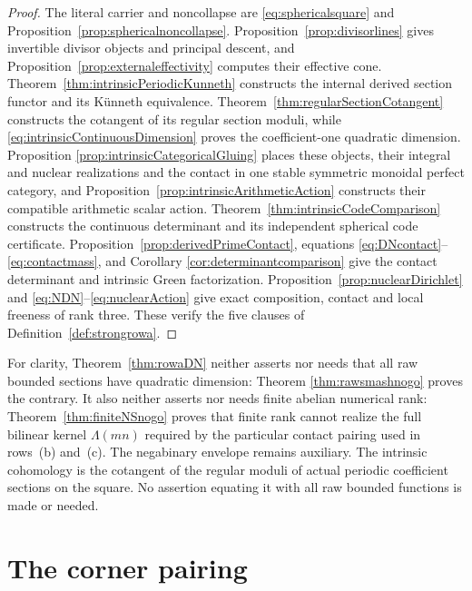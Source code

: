 \documentclass[11pt]{amsart}
\theoremstyle{definition}
\theoremstyle{remark}
\begin{document}
\begin{proof}
The literal carrier and noncollapse are
\eqref{eq:sphericalsquare} and Proposition~\ref{prop:sphericalnoncollapse}.
Proposition~\ref{prop:divisorlines} gives invertible divisor objects and
principal descent, and Proposition~\ref{prop:externaleffectivity} computes
their effective cone.  Theorem~\ref{thm:intrinsicPeriodicKunneth} constructs
the internal derived section functor and its K\"unneth equivalence.
Theorem~\ref{thm:regularSectionCotangent} constructs the cotangent of its
regular section moduli, while \eqref{eq:intrinsicContinuousDimension}
proves the coefficient-one quadratic dimension.  Proposition
\ref{prop:intrinsicCategoricalGluing} places these objects, their integral
and nuclear realizations and the contact in one stable symmetric monoidal
perfect category, and Proposition~\ref{prop:intrinsicArithmeticAction}
constructs their compatible arithmetic scalar action.
Theorem~\ref{thm:intrinsicCodeComparison} constructs the
continuous determinant and its independent spherical code certificate.
Proposition~\ref{prop:derivedPrimeContact}, equations
\eqref{eq:DNcontact}--\eqref{eq:contactmass}, and Corollary
\ref{cor:determinantcomparison} give the contact determinant and intrinsic
Green factorization.
Proposition~\ref{prop:nuclearDirichlet}
and \eqref{eq:NDN}--\eqref{eq:nuclearAction} give exact composition,
contact and local freeness of rank three.  These verify the five clauses of
Definition~\ref{def:strongrowa}.
\end{proof}

For clarity, Theorem~\ref{thm:rowaDN} neither asserts nor needs that
all raw bounded sections have quadratic dimension: Theorem
\ref{thm:rawsmashnogo} proves the contrary.  It also neither asserts nor
needs finite abelian numerical rank: Theorem~\ref{thm:finiteNSnogo} proves
that finite rank cannot realize the full bilinear kernel $\Lambda(mn)$
required by the particular contact pairing used in rows~(b) and~(c).
The negabinary envelope remains auxiliary.  The intrinsic cohomology is
the cotangent of the regular moduli of actual periodic coefficient sections
on the square.  No assertion equating it with all raw bounded functions is
made or needed.



\section{The corner pairing}
\end{document}
